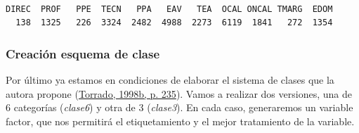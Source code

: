 \documentclass[
]{article}
\newenvironment{Shaded}{\begin{snugshade}}{\end{snugshade}}
\newcommand{\AttributeTok}[1]{\textcolor[rgb]{0.13,0.29,0.53}{#1}}
\newcommand{\FunctionTok}[1]{\textcolor[rgb]{0.13,0.29,0.53}{\textbf{#1}}}
\newcommand{\NormalTok}[1]{#1}
\newcommand{\OtherTok}[1]{\textcolor[rgb]{0.56,0.35,0.01}{#1}}
\newcommand{\SpecialCharTok}[1]{\textcolor[rgb]{0.81,0.36,0.00}{\textbf{#1}}}
\newcommand{\StringTok}[1]{\textcolor[rgb]{0.31,0.60,0.02}{#1}}
\begin{document}
\begin{Shaded}
\end{Shaded}

\begin{verbatim}

DIREC  PROF   PPE  TECN   PPA   EAV   TEA  OCAL ONCAL TMARG  EDOM 
  138  1325   226  3324  2482  4988  2273  6119  1841   272  1354 
\end{verbatim}

\hypertarget{creaciuxf3n-esquema-de-clase}{%
\subsubsection{Creación esquema de clase}\label{creaciuxf3n-esquema-de-clase}}

Por último ya estamos en condiciones de elaborar el sistema de clases que la autora propone (\protect\hyperlink{ref-Torrado1998d}{Torrado, 1998b, p. 235}). Vamos a realizar dos versiones, una de 6 categorías (\emph{clase6}) y otra de 3 (\emph{clase3}). En cada caso, generaremos un variable factor, que nos permitirá el etiquetamiento y el mejor tratamiento de la variable.
\end{document}
